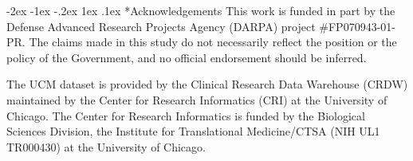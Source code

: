 \documentclass[onecolumn,,10pt]{IEEEtran}
\makeatletter
\renewcommand\section{\@startsection {section}{1}{\z@}%
  {-2ex \@plus -1ex \@minus -.2ex}%
  {1ex \@plus.1ex}%
  {\Large\bfseries\scshape}}
\makeatother
\begin{document}
\section*{Acknowledgements}
This work is funded in part by the Defense Advanced Research Projects Agency (DARPA) project \#FP070943-01-PR. The claims made in this study  do not necessarily reflect the position or the
policy of the Government, and no official endorsement should be inferred.

The UCM dataset is provided by the Clinical Research Data Warehouse (CRDW) maintained by the Center for Research Informatics (CRI) at the  University of Chicago. The Center for Research Informatics is funded by the Biological Sciences Division, the Institute for Translational Medicine/CTSA (NIH UL1 TR000430) at the University of Chicago. 




 


\end{document}
